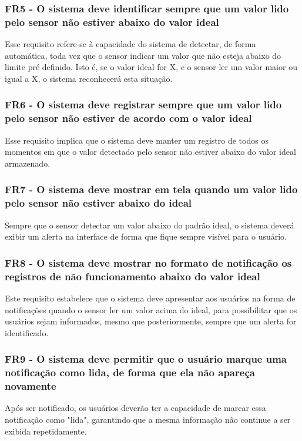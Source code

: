 \subsubsection{FR5 - O sistema deve identificar sempre que um valor lido pelo sensor não estiver abaixo do valor ideal}
Esse requisito refere-se à capacidade do sistema de detectar, de forma automática, toda vez que o sensor indicar um valor que não esteja abaixo do limite pré definido. Isto é, se o valor ideal for X, e o sensor ler um valor maior ou igual a X, o sistema reconhecerá esta situação.

\subsubsection{FR6 - O sistema deve registrar sempre que um valor lido pelo sensor não estiver de acordo com o valor ideal}
Esse requisito implica que o sistema deve manter um registro de todos os momentos em que o valor detectado pelo sensor não estiver abaixo do valor ideal armazenado.

\subsubsection{FR7 - O sistema deve mostrar em tela quando um valor lido pelo sensor não estiver abaixo do ideal}
Sempre que o sensor detectar um valor abaixo do padrão ideal, o sistema deverá exibir um alerta na interface de forma que fique sempre visível para o usuário.

\subsubsection{FR8 - O sistema deve mostrar no formato de notificação os registros de não funcionamento abaixo do valor ideal}
Este requisito estabelece que o sistema deve apresentar aos usuários na forma de notificações quando o sensor ler um valor acima do ideal, para possibilitar que os usuários sejam informados, mesmo que posteriormente, sempre que um alerta for identificado.

\subsubsection{FR9 - O sistema deve permitir que o usuário marque uma notificação como lida, de forma que ela não apareça novamente}
Após ser notificado, os usuários deverão ter a capacidade de marcar essa notificação como "lida", garantindo que a mesma informação não continue a ser exibida repetidamente.

